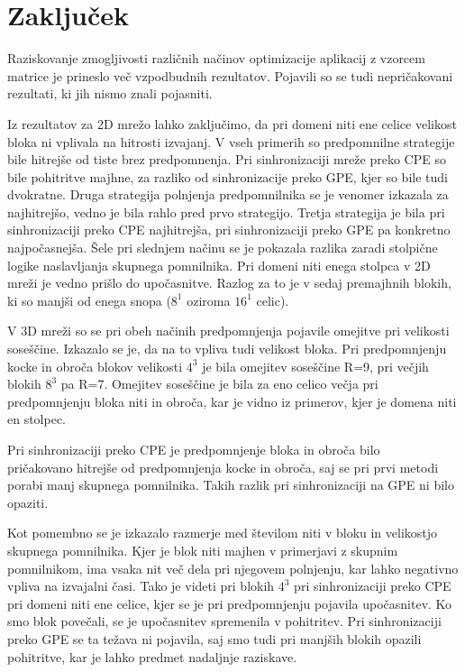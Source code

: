 \documentclass[a4paper, 12pt, openright]{book}
\begin{document}
\chapter{Zaključek}

Raziskovanje zmogljivosti različnih načinov optimizacije aplikacij z vzorcem matrice je prineslo več vzpodbudnih rezultatov.
Pojavili so se tudi nepričakovani rezultati, ki jih nismo znali pojasniti.

Iz rezultatov za 2D mrežo lahko zaključimo, da pri domeni niti ene celice velikost bloka ni vplivala na hitrosti izvajanj.
V vseh primerih so predpomnilne strategije bile hitrejše od tiste brez predpomnenja.
Pri sinhronizaciji mreže preko CPE so bile pohitritve majhne, za razliko od sinhronizacije preko GPE, kjer so bile tudi dvokratne.
Druga strategija polnjenja predpomnilnika se je venomer izkazala za najhitrejšo, vedno je bila rahlo pred prvo strategijo.
Tretja strategija je bila pri sinhronizaciji preko CPE najhitrejša, pri sinhronizaciji preko GPE pa konkretno najpočasnejša. Šele pri slednjem načinu se je pokazala razlika zaradi stolpične logike naslavljanja skupnega pomnilnika.
Pri domeni niti enega stolpca v 2D mreži je vedno prišlo do upočasnitve. Razlog za to je v sedaj premajhnih blokih, ki so manjši od enega snopa (\(8^1\) oziroma \(16^1\) celic).

V 3D mreži so se pri obeh načinih predpomnjenja pojavile omejitve pri velikosti soseščine. Izkazalo se je, da na to vpliva tudi velikost bloka.
Pri predpomnjenju kocke in obroča blokov velikosti \(4^3\) je bila omejitev soseščine R=9, pri večjih blokih \(8^3\) pa R=7.
Omejitev soseščine je bila za eno celico večja pri predpomnjenju bloka niti in obroča, kar je vidno iz primerov, kjer je domena niti en stolpec.

Pri \hfill sinhronizaciji \hfill preko \hfill CPE \hfill je \hfill predpomnjenje \hfill bloka \hfill in  \hfill obroča \hfill bilo \\ pričakovano hitrejše od predpomnjenja kocke in obroča, saj se pri prvi metodi porabi manj skupnega pomnilnika.
Takih razlik pri sinhronizaciji na GPE ni bilo opaziti.

Kot pomembno se je izkazalo razmerje med številom niti v bloku in velikostjo skupnega pomnilnika.
Kjer je blok niti majhen v primerjavi z skupnim pomnilnikom, ima vsaka nit več dela pri njegovem polnjenju, kar lahko negativno vpliva na izvajalni časi.
Tako je videti pri blokih \(4^3\) pri sinhronizaciji preko CPE pri domeni niti ene celice, kjer se je pri predpomnjenju pojavila upočasnitev.
Ko smo blok povečali, se je upočasnitev spremenila v pohitritev.
Pri sinhronizaciji preko GPE se ta težava ni pojavila, saj smo tudi pri manjših blokih opazili pohitritve, kar je lahko predmet nadaljnje raziskave.
\end{document}
